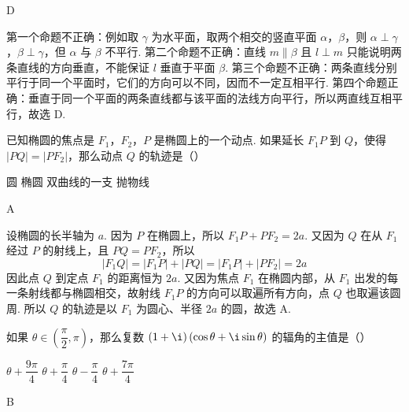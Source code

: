 \begin{answer}
D
\end{answer}

\begin{solution}
第一个命题不正确：例如取 \(\gamma\) 为水平面，取两个相交的竖直平面 \(\alpha\)，\(\beta\)，则 \(\alpha\perp\gamma\)，\(\beta\perp\gamma\)，但 \(\alpha\) 与 \(\beta\) 不平行. 第二个命题不正确：直线 \(m\parallel\beta\) 且 \(l\perp m\) 只能说明两条直线的方向垂直，不能保证 \(l\) 垂直于平面 \(\beta\). 第三个命题不正确：两条直线分别平行于同一个平面时，它们的方向可以不同，因而不一定互相平行. 第四个命题正确：垂直于同一个平面的两条直线都与该平面的法线方向平行，所以两直线互相平行，故选 D.
\end{solution}

\begin{problem}
已知椭圆的焦点是 \(F_{1}\)，\(F_{2}\)，\(P\) 是椭圆上的一个动点. 如果延长 \(F_{1}P\) 到 \(Q\)，使得 \(\lvert PQ\rvert=\lvert PF_{2}\rvert\)，那么动点 \(Q\) 的轨迹是（\quad）

\choices
    {圆}
    {椭圆}
    {双曲线的一支}
    {抛物线}
\end{problem}

\begin{answer}
A
\end{answer}

\begin{solution}
设椭圆的长半轴为 \(a\). 因为 \(P\) 在椭圆上，所以 \(F_{1}P+PF_{2}=2a\). 又因为 \(Q\) 在从 \(F_{1}\) 经过 \(P\) 的射线上，且 \(PQ=PF_{2}\)，所以
\[
\lvert F_{1}Q\rvert=\lvert F_{1}P\rvert+\lvert PQ\rvert=\lvert F_{1}P\rvert+\lvert PF_{2}\rvert=2a
\]
因此点 \(Q\) 到定点 \(F_{1}\) 的距离恒为 \(2a\). 又因为焦点 \(F_{1}\) 在椭圆内部，从 \(F_{1}\) 出发的每一条射线都与椭圆相交，故射线 \(F_{1}P\) 的方向可以取遍所有方向，点 \(Q\) 也取遍该圆周. 所以 \(Q\) 的轨迹是以 \(F_{1}\) 为圆心、半径 \(2a\) 的圆，故选 A.
\end{solution}

\begin{problem}
如果 \(\theta\in\left(\dfrac{\pi}{2},\pi\right)\)，那么复数 \(\left(1+\i\right)\left(\cos\theta+\i\sin\theta\right)\) 的辐角的主值是（\quad）

\choices
    {\(\theta+\dfrac{9\pi}{4}\)}
    {\(\theta+\dfrac{\pi}{4}\)}
    {\(\theta-\dfrac{\pi}{4}\)}
    {\(\theta+\dfrac{7\pi}{4}\)}
\end{problem}

\begin{answer}
B
\end{answer}

